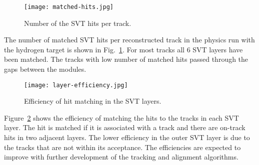 \begin{figure}[hbt] 
\centering 
\texttt{[image: matched-hits.jpg]}
\caption{Number of the SVT hits per track.}
\label{fig:matched-hits}
\end{figure}

The number of matched SVT hits per reconstructed track in the physics run with the hydrogen target is shown in Fig.~\ref{fig:matched-hits}. For most tracks all 6 SVT layers have been matched. The tracks with low number of matched hits passed through the gaps between the modules.


\begin{figure}[hbt] 
\centering 
\texttt{[image: layer-efficiency.jpg]}
\caption{Efficiency of hit matching in the SVT layers.}
\label{fig:layer-efficiency}
\end{figure}

Figure~\ref{fig:layer-efficiency} shows the efficiency of matching the hits to the tracks in each SVT layer. The hit is matched if it is associated with a track and there are on-track hits in two adjacent layers. The lower efficiency in the outer SVT layer is due to the tracks that are not within its acceptance. The efficiencies are expected to improve with further development of the tracking and alignment algorithms. 
